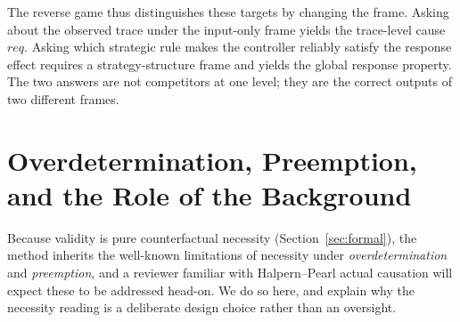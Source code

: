 \documentclass[11pt]{article}
\theoremstyle{remark}
\begin{document}
The reverse game thus distinguishes these targets by changing the frame. Asking
about the observed trace under the input-only frame yields the trace-level cause
\(req\). Asking which strategic rule makes the controller reliably satisfy the
response effect requires a strategy-structure frame and yields the global
response property. The two answers are not competitors at one level; they are the
correct outputs of two different frames.

\section{Overdetermination, Preemption, and the Role of the Background}
\label{sec:overdetermination}

Because validity is pure counterfactual necessity (Section~\ref{sec:formal}), the
method inherits the well-known limitations of necessity under
\emph{overdetermination} and \emph{preemption}, and a reviewer familiar with
Halpern--Pearl actual causation will expect these to be addressed head-on. We do
so here, and explain why the necessity reading is a deliberate design choice
rather than an oversight.
\end{document}
